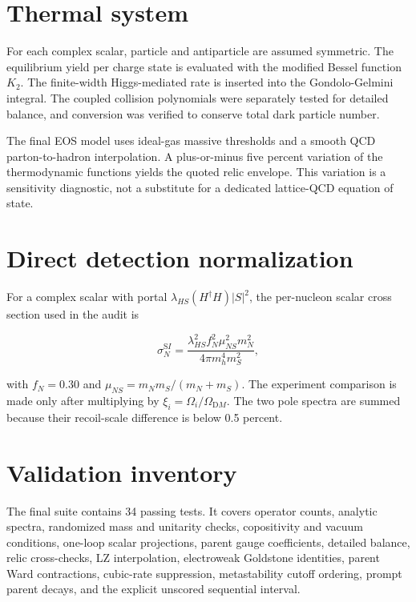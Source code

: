 \documentclass[
]{article}
\begin{document}
\hypertarget{thermal-system}{%
\section{Thermal system}\label{thermal-system}}

For each complex scalar, particle and antiparticle are assumed
symmetric. The equilibrium yield per charge state is evaluated with the
modified Bessel function \(K_2\). The finite-width Higgs-mediated rate
is inserted into the Gondolo-Gelmini integral. The coupled collision
polynomials were separately tested for detailed balance, and conversion
was verified to conserve total dark particle number.

The final EOS model uses ideal-gas massive thresholds and a smooth QCD
parton-to-hadron interpolation. A plus-or-minus five percent variation
of the thermodynamic functions yields the quoted relic envelope. This
variation is a sensitivity diagnostic, not a substitute for a dedicated
lattice-QCD equation of state.

\hypertarget{direct-detection-normalization}{%
\section{Direct detection
normalization}\label{direct-detection-normalization}}

For a complex scalar with portal \(\lambda_{HS}(H^\dagger H)|S|^2\), the
per-nucleon scalar cross section used in the audit is

\[
\sigma_N^{\mathrm SI}=
\frac{\lambda_{HS}^2f_N^2\mu_{NS}^2m_N^2}
{4\pi m_h^4m_S^2},
\]

with \(f_N=0.30\) and \(\mu_{NS}=m_Nm_S/(m_N+m_S)\). The experiment
comparison is made only after multiplying by
\(\xi_i=\Omega_i/\Omega_{\mathrm DM}\). The two pole spectra are summed
because their recoil-scale difference is below 0.5 percent.

\hypertarget{validation-inventory}{%
\section{Validation inventory}\label{validation-inventory}}

The final suite contains 34 passing tests. It covers operator counts,
analytic spectra, randomized mass and unitarity checks, copositivity and
vacuum conditions, one-loop scalar projections, parent gauge
coefficients, detailed balance, relic cross-checks, LZ interpolation,
electroweak Goldstone identities, parent Ward contractions, cubic-rate
suppression, metastability cutoff ordering, prompt parent decays, and
the explicit unscored sequential interval.
\end{document}
